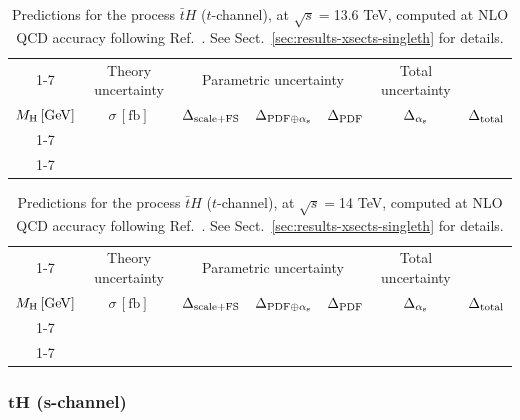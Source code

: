 \begin{table}[ht!]
\caption{\label{tab:th-t-atop136} Predictions for the process $\bar tH$ ($t$-channel), at $\sqrt{s}=$13.6 TeV, computed at NLO QCD accuracy following Ref.~\cite{Demartin:2015uha}. See Sect.~\ref{sec:results-xsects-singleth} for details.}
\centering
\scriptsize
{\renewcommand{\arraystretch}{1.4}
\begin{tabular}{| cc | c | ccc | c |}
\cline{1-7}
\multicolumn{2}{|c|}{\(\sqrt{s} = 13.6\,\mathrm{TeV}\)} &
\multicolumn{1}{|c|}{Theory uncertainty} &
\multicolumn{3}{|c|}{Parametric uncertainty} &
\multicolumn{1}{c|}{Total uncertainty} \\
\(M_\mathrm{H}\,[\mathrm{GeV}]\) & \(\sigma\,[\mathrm{fb}]\) &
\(\Delta_{\rm scale+\textrm{FS}}\) &
\(\Delta_{{\rm PDF}\oplus\alpha_{\mathrm{s}}}\) &
{\color{black!55}\(\Delta_{\rm PDF}\)} & {\color{black!55}\(\Delta_{\alpha_{\mathrm{s}}}\)} &
\(\Delta_{\rm total}\)
\\
\cline{1-7}
 \\
\cline{1-7}
\end{tabular}
}
\end{table}

\begin{table}[ht!]
\caption{\label{tab:th-t-atop14} Predictions for the process $\bar tH$ ($t$-channel), at $\sqrt{s}=$14 TeV, computed at NLO QCD accuracy following Ref.~\cite{Demartin:2015uha}. See Sect.~\ref{sec:results-xsects-singleth} for details.}
\centering
\scriptsize
{\renewcommand{\arraystretch}{1.4}
\begin{tabular}{| cc | c | ccc | c |}
\cline{1-7}
\multicolumn{2}{|c|}{\(\sqrt{s} = 14\,\mathrm{TeV}\)} &
\multicolumn{1}{|c|}{Theory uncertainty} &
\multicolumn{3}{|c|}{Parametric uncertainty} &
\multicolumn{1}{c|}{Total uncertainty} \\
\(M_\mathrm{H}\,[\mathrm{GeV}]\) & \(\sigma\,[\mathrm{fb}]\) &
\(\Delta_{\rm scale+\textrm{FS}}\) &
\(\Delta_{{\rm PDF}\oplus\alpha_{\mathrm{s}}}\) &
{\color{black!55}\(\Delta_{\rm PDF}\)} & {\color{black!55}\(\Delta_{\alpha_{\mathrm{s}}}\)} &
\(\Delta_{\rm total}\)
\\
\cline{1-7}
 \\
\cline{1-7}
\end{tabular}
}
\end{table}

\FloatBarrier
\subsubsection{\texorpdfstring{$\boldsymbol{tH}$}{tH} (s-channel)}

